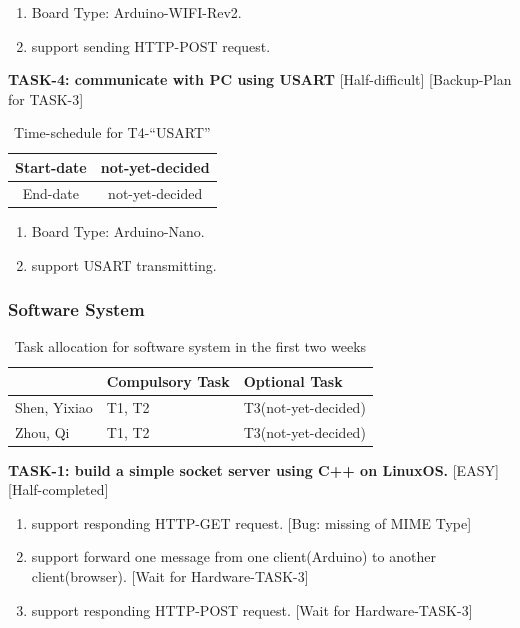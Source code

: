 \documentclass[11pt, a4paper]{article}
\begin{document}
\begin{enumerate}
	\item Board Type: Arduino-WIFI-Rev2.
	\item support sending HTTP-POST request.
\end{enumerate}

\textbf{TASK-4: communicate with PC using USART} 	[Half-difficult] [Backup-Plan for TASK-3]
\begin{table}[!ht]
	\centering
	\caption{Time-schedule for T4-``USART''}
	\begin{tabular}{|c|c|}
		\hline
		Start-date & not-yet-decided \\ \hline
		End-date & not-yet-decided \\ \hline
	\end{tabular}
	\label{tab:HD_TASK_4}
\end{table}

\begin{enumerate}
	\item Board Type: Arduino-Nano.
	\item support USART transmitting.
\end{enumerate}

\newpage
\subsubsection{Software System}


\begin{table}[!ht]
	\centering
	\caption{Task allocation for software system in the first two weeks}
	\begin{tabular}{|l|l|l|}
		\hline
		~ & Compulsory Task & Optional Task \\ \hline
		Shen, Yixiao & T1, T2 & T3(not-yet-decided) \\ \hline
		Zhou, Qi & T1, T2 & T3(not-yet-decided) \\ \hline
	\end{tabular}
	\label{tab:software_group}
\end{table}

\textbf{TASK-1: build a simple socket server using C++ on LinuxOS.}     [EASY] [Half-completed]
\begin{enumerate}
    \item support responding HTTP-GET request.	[Bug: missing of MIME Type]
    \item support forward one message from one client(Arduino) to another client(browser). [Wait for Hardware-TASK-3]
    \item support responding HTTP-POST request. [Wait for Hardware-TASK-3]
\end{enumerate}
\end{document}
